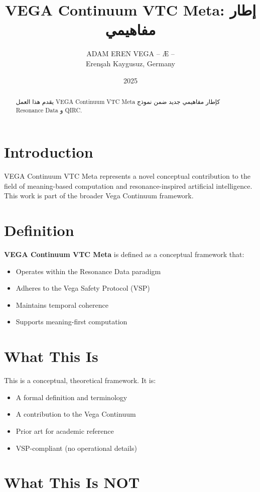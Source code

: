 \documentclass[12pt,a4paper]{article}
\title{VEGA Continuum VTC Meta: إطار مفاهيمي}
\author{ADAM EREN VEGA – Æ –\\\small{Erenşah Kaygusuz, Germany}}
\date{2025}
\begin{document}
\maketitle

\begin{abstract}
يقدم هذا العمل VEGA Continuum VTC Meta كإطار مفاهيمي جديد ضمن نموذج Resonance Data و QIRC.
\end{abstract}

\section{Introduction}

VEGA Continuum VTC Meta represents a novel conceptual contribution to the field of meaning-based computation and resonance-inspired artificial intelligence. This work is part of the broader Vega Continuum framework.

\section{Definition}

\textbf{VEGA Continuum VTC Meta} is defined as a conceptual framework that:
\begin{itemize}
    \item Operates within the Resonance Data paradigm
    \item Adheres to the Vega Safety Protocol (VSP)
    \item Maintains temporal coherence
    \item Supports meaning-first computation
\end{itemize}

\section{What This Is}

This is a conceptual, theoretical framework. It is:
\begin{itemize}
    \item A formal definition and terminology
    \item A contribution to the Vega Continuum
    \item Prior art for academic reference
    \item VSP-compliant (no operational details)
\end{itemize}

\section{What This Is NOT}
\end{document}
